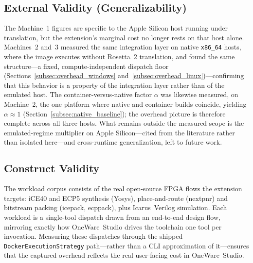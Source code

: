 \subsection{External Validity (Generalizability)}
The Machine~1 figures are specific to the Apple Silicon host running under translation, but the extension's marginal cost no longer rests on that host alone. Machines~2 and~3 measured the same integration layer on native \texttt{x86\_64} hosts, where the image executes without Rosetta~2 translation, and found the same structure---a fixed, compute-independent dispatch floor (Sections~\ref{subsec:overhead_windows} and~\ref{subsec:overhead_linux})---confirming that this behavior is a property of the integration layer rather than of the emulated host. The container-versus-native factor $\alpha$ was likewise measured, on Machine~2, the one platform where native and container builds coincide, yielding $\alpha \approx 1$ (Section~\ref{subsec:native_baseline}); the overhead picture is therefore complete across all three hosts. What remains outside the measured scope is the emulated-regime multiplier on Apple Silicon---cited from the literature rather than isolated here---and cross-runtime generalization, left to future work.

\subsection{Construct Validity}
\label{subsec:construct_validity}
The workload corpus consists of the real open-source FPGA flows the extension targets: iCE40 and ECP5 synthesis (Yosys), place-and-route (nextpnr) and bitstream packing (icepack, ecppack), plus Icarus~Verilog simulation. Each workload is a single-tool dispatch drawn from an end-to-end design flow, mirroring exactly how OneWare~Studio drives the toolchain one tool per invocation. Measuring these dispatches through the shipped \texttt{DockerExecutionStrategy} path---rather than a CLI approximation of it---ensures that the captured overhead reflects the real user-facing cost in OneWare~Studio.
